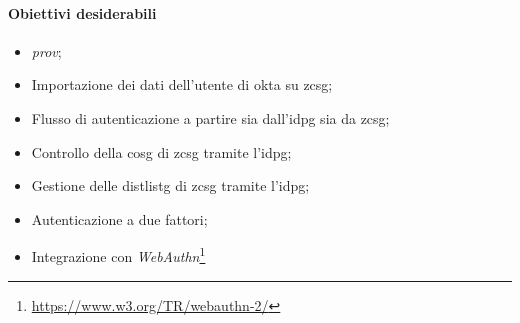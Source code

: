     \paragraph{Obiettivi desiderabili}
    \begin{itemize}
        \item \textit{\gls{prov}};
        \item Importazione dei dati dell'utente di \gls{okta} su \gls{zcsg};
        \item Flusso di autenticazione a partire sia dall'\gls{idpg} sia da \gls{zcsg};
        \item Controllo della \gls{cosg} di \gls{zcsg} tramite l'\gls{idpg};
        \item Gestione delle \gls{distlistg} di \gls{zcsg} tramite l'\gls{idpg};
        \item Autenticazione a due fattori;
        \item Integrazione con \textit{WebAuthn}\footnote{\url{https://www.w3.org/TR/webauthn-2/}}
    \end{itemize}

